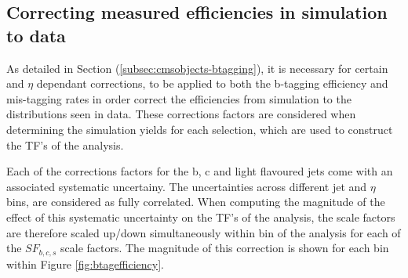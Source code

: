 \subsection{Correcting measured efficiencies in simulation to data}
\label{subsec:formulamethodsf}

As detailed in Section (\ref{subsec:cmsobjects-btagging}), it is necessary for certain \pt and $\eta$ dependant corrections, to be applied to both the b-tagging efficiency and mis-tagging rates in order correct the efficiencies from simulation to the distributions seen in data. These corrections factors are considered when determining the simulation yields for each selection, which are used to construct the \ac{TF}'s of the analysis. 

Each of the corrections factors for the b, c and light flavoured jets come with an associated systematic uncertainy. The uncertainties across different jet \pt and $\eta$ bins, are considered as fully correlated. When computing the magnitude of the effect of this systematic uncertainty on the \ac{TF}'s of the analysis, the scale factors are therefore scaled up/down simultaneously within \theht bin of the analysis for each of the $SF_{b,c,s}$ scale factors. The magnitude of this correction is shown for each \theht bin within Figure \ref{fig:btagefficiency}. 

